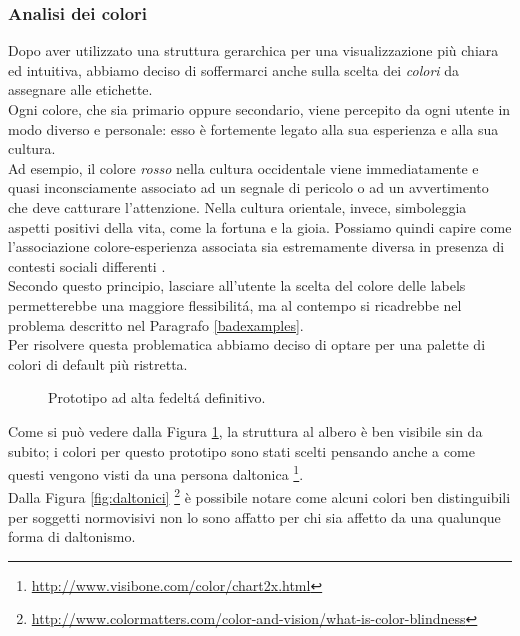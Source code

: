 \documentclass[12pt]{article} %
\begin{document}
\subsubsection{Analisi dei colori}
Dopo aver utilizzato una struttura gerarchica per una visualizzazione più chiara ed intuitiva, abbiamo deciso di soffermarci anche sulla scelta dei \emph{colori} da assegnare alle etichette.\\
Ogni colore, che sia primario oppure secondario, viene percepito da ogni utente in modo diverso e personale: esso \`e fortemente legato alla sua esperienza e alla sua cultura.\\
Ad esempio, il colore \emph{rosso} nella cultura occidentale viene immediatamente e quasi inconsciamente associato ad un segnale di pericolo o ad un avvertimento che deve catturare l'attenzione. Nella cultura orientale, invece, simboleggia aspetti positivi della vita, come la fortuna e la gioia. Possiamo quindi capire come l'associazione colore-esperienza associata sia estremamente diversa in presenza di contesti sociali differenti \cite{thesis}.\\
Secondo questo principio, lasciare all'utente la scelta del colore delle labels permetterebbe una maggiore flessibilit\'a, ma al contempo si ricadrebbe nel problema descritto nel Paragrafo \ref{badexamples}.\\
Per risolvere questa problematica abbiamo deciso di optare per una palette di colori di default più ristretta.

\begin{figure}[H] 
\caption{Prototipo ad alta fedelt\'a definitivo.}
\label{fig:finale}
\end{figure}

Come si può vedere dalla Figura \ref{fig:finale}, la struttura al albero \`e ben visibile sin da subito; i colori per questo prototipo sono stati scelti pensando anche a come questi vengono visti da una persona daltonica \footnote{\url{http://www.visibone.com/color/chart2x.html}}.\\
Dalla Figura \ref{fig:daltonici} \footnote{\url{http://www.colormatters.com/color-and-vision/what-is-color-blindness}} \`e possibile notare come alcuni colori ben distinguibili per soggetti normovisivi non lo sono affatto per chi sia affetto da una qualunque forma di daltonismo.
\end{document}
